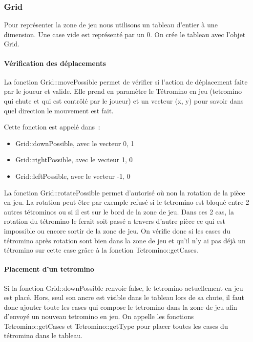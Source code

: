 \documentclass[a4paper, 12pt]{article}
\begin{document}
		\subsubsection{Grid}
			Pour représenter la zone de jeu nous utilisons un tableau d’entier à une dimension. Une case vide est représenté par un 0. 
			On crée le tableau avec l’objet Grid.

			\paragraph{Vérification des déplacements}
				La fonction Grid::movePossible permet de vérifier si l’action de déplacement faite par le joueur et valide. Elle prend en paramètre le Tétromino en jeu (tetromino qui chute et qui est contrôlé par le joueur) et un vecteur (x, y) pour savoir dans quel direction le mouvement est fait.

				Cette fonction est appelé dans : 
				\begin{itemize}
					\item Grid::downPossible, avec le vecteur {0, 1}
					\item Grid::rightPossible, avec le vecteur {1, 0}
					\item Grid::leftPossible, avec le vecteur {-1, 0}
				\end{itemize}

				La fonction Grid::rotatePossible permet d’autorisé où non la rotation de la pièce en jeu. La rotation peut être par exemple refusé si le tetromino est bloqué entre 2 autres tétrominos ou si il est sur le bord de la zone de jeu. Dans ces 2 cas, la rotation du tétromino le ferait soit passé a travers d’autre pièce ce qui est impossible ou encore sortir de la zone de jeu. On vérifie donc si les cases du tétromino après rotation sont bien dans la zone de jeu et qu'il n'y ai pas déjà un tétromino sur cette case grâce à la fonction Tetromino::getCases.

			\paragraph{Placement d’un tetromino}
				Si la fonction Grid::downPossible renvoie false, le tetromino actuellement en jeu est placé. Hors, seul son ancre est visible dans le tableau lors de sa chute, il faut donc ajouter toute les cases qui compose le tetromino dans la zone de jeu afin d’envoyé un nouveau tetromino en jeu.
				On appelle les fonctions Tetromino::getCases et Tetromino::getType pour placer toutes les cases du tétromino dans le tableau.
\end{document}
